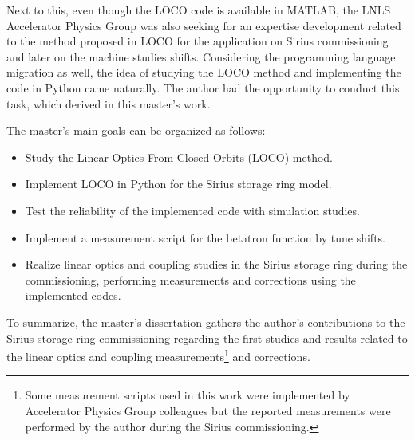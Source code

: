 Next to this, even though the LOCO code is available in MATLAB, the LNLS Accelerator Physics Group was also seeking for an expertise development related to the method proposed in LOCO for the application on Sirius commissioning and later on the machine studies shifts. Considering the programming language migration as well, the idea of studying the LOCO method and implementing the code in Python came naturally. The author had the opportunity to conduct this task, which derived in this master's work. 

The master's main goals can be organized as follows:
\begin{itemize}
    \item Study the Linear Optics From Closed Orbits (LOCO) method.
    \item Implement LOCO in Python for the Sirius storage ring model.
    \item Test the reliability of the implemented code with simulation studies.
    \item Implement a measurement script for the betatron function by tune shifts.
    \item Realize linear optics and coupling studies in the Sirius storage ring during the commissioning, performing measurements and corrections using the implemented codes.
\end{itemize}

To summarize, the master's dissertation gathers the author's contributions to the Sirius storage ring commissioning regarding the first studies and results related to the linear optics and coupling measurements\footnote{Some measurement scripts used in this work were implemented by Accelerator Physics Group  colleagues but the reported measurements were performed by the author during the Sirius commissioning.} and corrections. 










